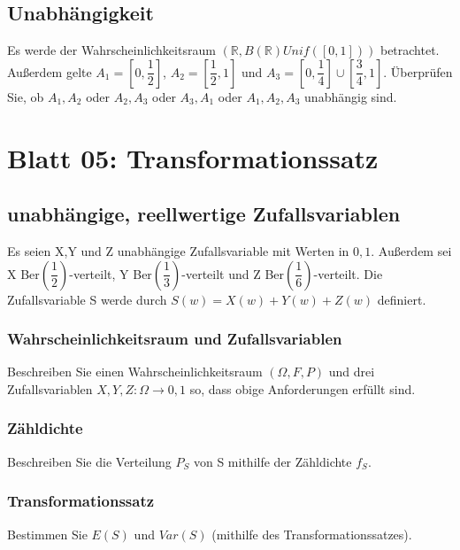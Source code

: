 \documentclass[paper=a4, fontsize=11pt]{scrartcl}
\numberwithin{equation}{section}
\numberwithin{figure}{section}
\numberwithin{table}{section}
\begin{document}
\subsection{Unabhängigkeit}
Es werde der Wahrscheinlichkeitsraum $(\mathbb{R},B(\mathbb{R})Unif([0,1]))$ betrachtet. Außerdem gelte $A_{1}=[0, \dfrac{1}{2}]$, $A_{2}=[\dfrac{1}{2},1]$ und $A_{3}=[0,\dfrac{1}{4}] \cup [\dfrac{3}{4},1]$. Überprüfen Sie, ob $A_{1},A_{2}$ oder $A_{2},A_{3}$ oder $A_{3},A_{1}$ oder $A_{1},A_{2},A_{3}$ unabhängig sind. \\

\section{Blatt 05: Transformationssatz}
\subsection{unabhängige, reellwertige Zufallsvariablen}
Es seien X,Y und Z unabhängige Zufallsvariable mit Werten in ${0,1}$. Außerdem sei X Ber$(\dfrac{1}{2})$-verteilt, Y Ber$(\dfrac{1}{3})$-verteilt und Z Ber$(\dfrac{1}{6})$-verteilt. Die Zufallsvariable S werde durch $S(w)=X(w)+Y(w)+Z(w)$ definiert.

\subsubsection{Wahrscheinlichkeitsraum und Zufallsvariablen}
Beschreiben Sie einen Wahrscheinlichkeitsraum $(\Omega, F, P)$ und drei Zufallsvariablen $X,Y,Z: \Omega \rightarrow {0,1}$ so, dass obige Anforderungen erfüllt sind. \\

\subsubsection{Zähldichte}
Beschreiben Sie die Verteilung $P_{S}$ von S mithilfe der Zähldichte $f_{S}$. \\

\subsubsection{Transformationssatz}
Bestimmen Sie $E(S)$ und $Var(S)$ (mithilfe des Transformationssatzes). \\
\end{document}
